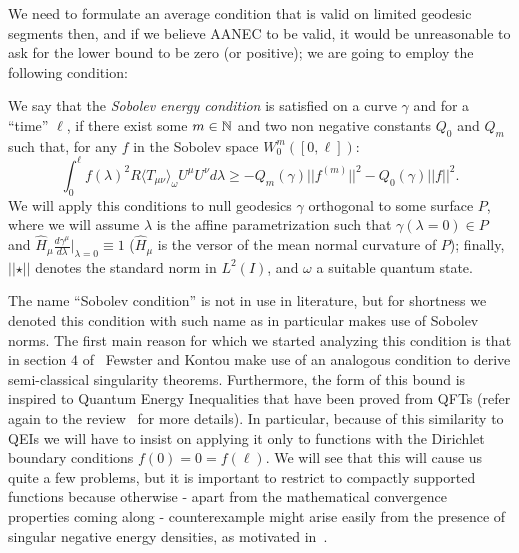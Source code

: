 We need to formulate an average condition that is valid on limited geodesic segments then, and if we believe AANEC to be valid, it would be unreasonable to ask for the lower bound to be zero (or positive); we are going to employ the following condition:

\begin{definition}
	We say that the \emph{Sobolev energy condition} is satisfied on a curve \(\gamma\) and for a ``time'' \(\ell\), if there exist some \(m\in {\mathbb{N}}\) and two non negative constants \(Q_0\) and \(Q_m\) such that, for any \(f\) in the Sobolev space \(W_0^m([0,\ell])\):
    \begin{equation}
        \label{eq:Sobolev-condition}
        \int_0^{\ell} f(\lambda)^2 R\langle T_{\mu\nu}\rangle_{\omega}U^{\mu}U^{\nu} d\lambda \ge -Q_m(\gamma) \vert\vert f^{(m)}\vert\vert^2 - Q_0(\gamma) \vert\vert f\vert\vert^2.
    \end{equation}
	\noindent
	We will apply this conditions to null geodesics \(\gamma\) orthogonal to some surface \(P\), where we will assume \(\lambda\) is the affine parametrization such that \(\gamma(\lambda = 0) \in P\) and \(\hat{H}_{\mu}\frac{d\gamma^{\mu}}{d\lambda}\Big\vert_{\lambda = 0} \equiv 1\) (\(\hat{H}_{\mu}\) is the versor of the mean normal curvature of \(P\)); finally, \(\vert\vert \star \vert\vert\) denotes the standard norm in \(L^2(I)\), and \(\omega\) a suitable quantum state.
\end{definition}

The name ``Sobolev condition'' is not in use in literature, but for shortness we denoted this condition with such name as in particular makes use of Sobolev norms.
The first main reason for which we started analyzing this condition is that in section \(4\) of~\cite{fewster2020new} Fewster and Kontou make use of an analogous condition to derive semi-classical singularity theorems.
Furthermore, the form of this bound is inspired to Quantum Energy Inequalities that have been proved from QFTs (refer again to the review~\cite[]{kontou2020energy} for more details). In particular, because of this similarity to QEIs we will have to insist on applying it only to functions with the Dirichlet boundary conditions \(f(0) = 0 = f(\ell) \). We will see that this will cause us quite a few problems, but it is important to restrict to compactly supported functions because otherwise - apart from the mathematical convergence properties coming along - counterexample might arise easily from the presence of singular negative energy densities, as motivated in~\cite[]{ford1998quantum}.

